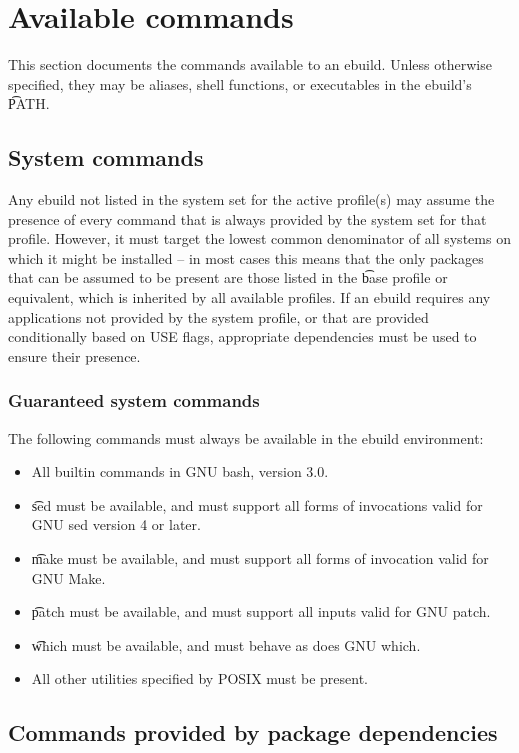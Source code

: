 \section{Available commands}
\label{ebuild-env-commands}

This section documents the commands available to an ebuild. Unless otherwise specified, they may be
aliases, shell functions, or executables in the ebuild's \t{PATH}.

\subsection{System commands}

Any ebuild not listed in the system set for the active profile(s) may assume the presence of every
command that is always provided by the system set for that profile. However, it must target the
lowest common denominator of all systems on which it might be installed -- in most cases this means
that the only packages that can be assumed to be present are those listed in the \t{base} profile or
equivalent, which is inherited by all available profiles. If an ebuild requires any applications not
provided by the system profile, or that are provided conditionally based on USE flags, appropriate
dependencies must be used to ensure their presence.

\subsubsection{Guaranteed system commands}

The following commands must always be available in the ebuild environment:
\begin{itemize}
\item All builtin commands in GNU bash, version 3.0.
\item \t{sed} must be available, and must support all forms of invocations valid for GNU sed
    version 4 or later.
\item \t{make} must be available, and must support all forms of invocation valid for GNU Make.
\item \t{patch} must be available, and must support all inputs valid for GNU patch.
\item \t{which} must be available, and must behave as does GNU which.
\item All other utilities specified by POSIX must be present.
\end{itemize}

\subsection{Commands provided by package dependencies}

